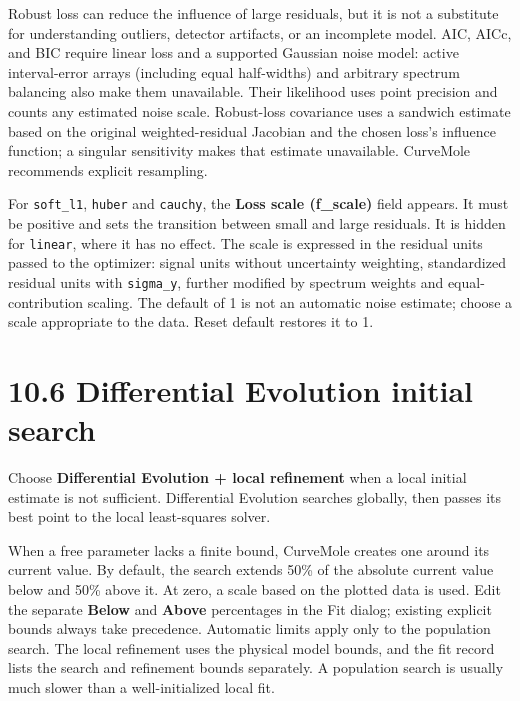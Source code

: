 \documentclass[
  10pt,
  a4paper,
  oneside]{scrreprt}
\begin{document}
Robust loss can reduce the influence of large residuals, but it is not a
substitute for understanding outliers, detector artifacts, or an
incomplete model. AIC, AICc, and BIC require linear loss and a supported
Gaussian noise model: active interval-error arrays (including equal
half-widths) and arbitrary spectrum balancing also make them
unavailable. Their likelihood uses point precision and counts any
estimated noise scale. Robust-loss covariance uses a sandwich estimate
based on the original weighted-residual Jacobian and the chosen loss's
influence function; a singular sensitivity makes that estimate
unavailable. CurveMole recommends explicit resampling.

For \texttt{soft\_l1}, \texttt{huber} and \texttt{cauchy}, the
\textbf{Loss scale (f\_scale)} field appears. It must be positive and
sets the transition between small and large residuals. It is hidden for
\texttt{linear}, where it has no effect. The scale is expressed in the
residual units passed to the optimizer: signal units without uncertainty
weighting, standardized residual units with \texttt{sigma\_y}, further
modified by spectrum weights and equal-contribution scaling. The default
of 1 is not an automatic noise estimate; choose a scale appropriate to
the data. Reset default restores it to 1.

\hypertarget{differential-evolution-initial-search}{%
\section{10.6 Differential Evolution initial
search}\label{differential-evolution-initial-search}}

Choose \textbf{Differential Evolution + local refinement} when a local
initial estimate is not sufficient. Differential Evolution searches
globally, then passes its best point to the local least-squares solver.

When a free parameter lacks a finite bound, CurveMole creates one around
its current value. By default, the search extends 50\% of the absolute
current value below and 50\% above it. At zero, a scale based on the
plotted data is used. Edit the separate \textbf{Below} and
\textbf{Above} percentages in the Fit dialog; existing explicit bounds
always take precedence. Automatic limits apply only to the population
search. The local refinement uses the physical model bounds, and the fit
record lists the search and refinement bounds separately. A population
search is usually much slower than a well-initialized local fit.
\end{document}
